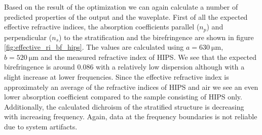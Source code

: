 Based on the result of the optimization we can again calculate a number of predicted properties of the output and the waveplate. First of all the expected effective refractive indices, the absorption coefficients parallel ($n_p$) and perpendicular ($n_s$) to the stratification and the birefringence are shown in figure \ref{fig:effective_ri_bf_hips}. The values are calculated using $a=\SI{630}{\micro \meter}$, $b=\SI{520}{\micro \meter}$ and the measured refractive index of HIPS. We see that the expected birefringence is around $0.086$ with a relatively low dispersion although with a slight increase at lower frequencies. Since the effective refractive index is approximately an average of the refractive indices of HIPS and air we see an even lower absorption coefficient compared to the sample consisting of HIPS only. Additionally, the calculated dichroism of the stratified structure is decreasing with increasing frequency. Again, data at the frequency boundaries is not reliable due to system artifacts.


